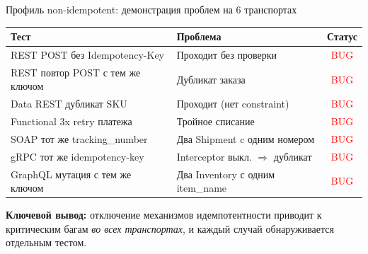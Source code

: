 \documentclass[aspectratio=169]{beamer}
\begin{document}
\begin{frame}{Профиль non-idempotent: демонстрация проблем на 6 транспортах}
\scriptsize
\begin{table}
\centering
\begin{tabular}{@{}p{5cm}p{4.5cm}c@{}}
\toprule
\textbf{Тест} & \textbf{Проблема} & \textbf{Статус} \\
\midrule
REST POST без Idempotency-Key & Проходит без проверки                    & \textcolor{red}{BUG} \\
REST повтор POST с тем же ключом & Дубликат заказа                       & \textcolor{red}{BUG} \\
Data REST дубликат SKU & Проходит (нет constraint)                       & \textcolor{red}{BUG} \\
Functional 3x retry платежа & Тройное списание                           & \textcolor{red}{BUG} \\
SOAP тот же tracking\_number & Два Shipment c одним номером              & \textcolor{red}{BUG} \\
gRPC тот же idempotency-key & Interceptor выкл. $\Rightarrow$ дубликат   & \textcolor{red}{BUG} \\
GraphQL мутация с тем же ключом & Два Inventory с одним item\_name        & \textcolor{red}{BUG} \\
\bottomrule
\end{tabular}
\end{table}

\vspace{2mm}
\textbf{Ключевой вывод:} отключение механизмов идемпотентности приводит к критическим багам \emph{во всех транспортах}, и каждый случай обнаруживается отдельным тестом.
\end{frame}
\end{document}
